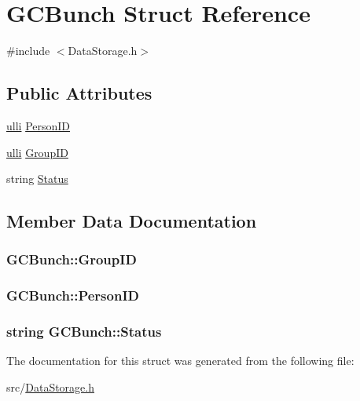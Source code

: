 \hypertarget{structGCBunch}{
\section{GCBunch Struct Reference}
\label{d4/d10/structGCBunch}
}


{\ttfamily \#include $<$DataStorage.h$>$}

\subsection*{Public Attributes}
\begin{DoxyCompactItemize}
\item 
\hyperlink{DataStorage_8h_afebafa022413aaef27ce1b01cbfa9791}{ulli} \hyperlink{structGCBunch_a6246664eeedfa124ca01955d2a6a5208}{PersonID}
\item 
\hyperlink{DataStorage_8h_afebafa022413aaef27ce1b01cbfa9791}{ulli} \hyperlink{structGCBunch_acd31590dc57c33417bb7cda395e1e8de}{GroupID}
\item 
string \hyperlink{structGCBunch_ae25795ff5a5a8e74a691b323967329fe}{Status}
\end{DoxyCompactItemize}


\subsection{Member Data Documentation}
\hypertarget{structGCBunch_acd31590dc57c33417bb7cda395e1e8de}{
\subsubsection[{GroupID}]{ {\bf GCBunch::GroupID}}}
\label{d4/d10/structGCBunch_acd31590dc57c33417bb7cda395e1e8de}
\hypertarget{structGCBunch_a6246664eeedfa124ca01955d2a6a5208}{
\subsubsection[{PersonID}]{ {\bf GCBunch::PersonID}}}
\label{d4/d10/structGCBunch_a6246664eeedfa124ca01955d2a6a5208}
\hypertarget{structGCBunch_ae25795ff5a5a8e74a691b323967329fe}{
\subsubsection[{Status}]{\setlength{\rightskip}{0pt plus 5cm}string {\bf GCBunch::Status}}}
\label{d4/d10/structGCBunch_ae25795ff5a5a8e74a691b323967329fe}


The documentation for this struct was generated from the following file:\begin{DoxyCompactItemize}
\item 
src/\hyperlink{DataStorage_8h}{DataStorage.h}\end{DoxyCompactItemize}
